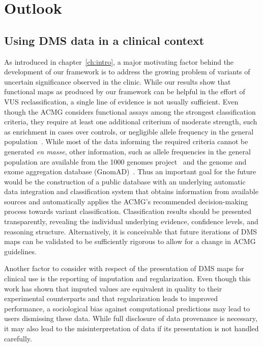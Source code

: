 \section{Outlook}

\subsection{Using DMS data in a clinical context}

As introduced in chapter~\ref{ch:intro}, a major motivating factor behind the development of our framework is to address the growing problem of variants of uncertain significance observed in the clinic. While our results show that functional maps as produced by our framework can be helpful in the effort of VUS reclassification, a single line of evidence is not usually sufficient. Even though the ACMG considers functional assays among the strongest classification criteria, they require at least one additional criterium of moderate strength, such as enrichment in cases over controls, or negligible allele frequency in the general population~\cite{richards_standards_2015}. While most of the data informing the required criteria cannot be generated \textit{en masse}, other information, such as allele frequencies in the general population are available from the 1000 genomes project~\cite{the_1000_genomes_project_consortium_global_2015} and the genome and exome aggregation database (GnomAD)~\cite{lek_analysis_2016}. Thus an important goal for the future would be the construction of a public database with an underlying automatic data integration and classification system that obtains information from available sources and automatically applies the ACMG's recommended decision-making process towards variant classification. Classification results should be presented transparently, revealing the individual underlying evidence, confidence levels, and reasoning structure. 
Alternatively, it is conceivable that future iterations of DMS maps can be validated to be sufficiently rigorous to allow for a change in ACMG guidelines.

Another factor to consider with respect of the presentation of DMS maps for clinical use is the reporting of imputation and regularization. Even though this work has shown that imputed values are equivalent in quality to their experimental counterparts and that regularization leads to improved performance, a sociological bias against computational predictions may lead to users dismissing these data. While full disclosure of data provenance is necessary, it may also lead to the misinterpretation of data if its presentation is not handled carefully.


